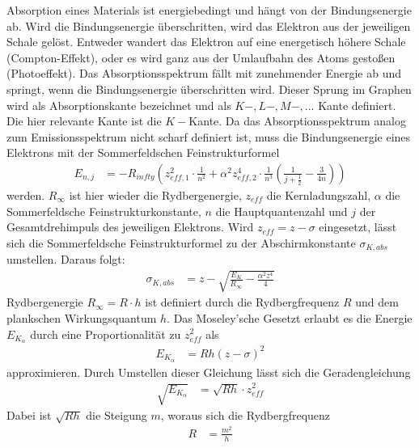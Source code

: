 \justifying Absorption eines Materials ist energiebedingt und hängt von der Bindungsenergie ab. Wird die Bindungsenergie 
überschritten, wird das Elektron aus der jeweiligen Schale gelöst. Entweder wandert das Elektron auf eine energetisch höhere Schale (Compton-Effekt),
oder es wird ganz aus der Umlaufbahn des Atoms gestoßen (Photoeffekt). Das Absorptionsspektrum fällt mit zunehmender Energie ab und springt, wenn
die Bindungsenergie überschritten wird. Dieser Sprung im Graphen wird als Absorptionskante bezeichnet und als $K-, L-, M-,...$ Kante definiert. 
Die hier relevante Kante ist die $K-$Kante. Da das Absorptionsspektrum analog zum Emissionsspektrum nicht scharf definiert ist, muss die Bindungsenergie
eines Elektrons mit der Sommerfeldschen Feinstrukturformel \cite{V602} 
\begin{align}
    E_{n,j} &= -R_{infty} \left( z_{eff,1}^2 \cdot \frac{1}{n^2} + \alpha^2 z_{eff,2}^4 \cdot \frac{1}{n^3} \left( \frac{1}{j+\frac{1}{2}} - \frac{3}{4n} \right) \right) \label{eq:3}
\end{align}
\justifying werden. $R_{\infty}$ ist hier wieder die Rydbergenergie, $z_{eff}$ die Kernladungszahl, $\alpha$ die 
Sommerfeldsche Feinstrukturkonstante, $n$ die Hauptquantenzahl und $j$ der Gesamtdrehimpuls des jeweiligen Elektrons. Wird $z_{eff}=z-\sigma$
eingesetzt, lässt sich die Sommerfeldsche Feinstrukturformel zu der Abschirmkonstante $\sigma_{K,abs}$ umstellen. Daraus folgt: \cite{V602}
\begin{align}
    \sigma_{K,abs} &= z - \sqrt{\frac{E_K}{R_{\infty}} - \frac{\alpha^2 z^4}{4}} \label{eq:4}
\end{align}
\justifying Rydbergenergie $R_{\infty}= R\cdot h$ ist definiert durch die Rydbergfrequenz $R$ und dem plankschen Wirkungsquantum $h$.
Das Moseley'sche Gesetzt erlaubt es die Energie $E_{K_{\alpha}}$ durch eine Proportionalität zu $z_{eff}^2$ als 
\begin{align}
    E_{K_{\alpha}} &= Rh \left( z-\sigma \right)^2 \label{eq:Mosel}
\end{align}
\justifying approximieren. Durch Umstellen dieser Gleichung lässt sich die Geradengleichung
\begin{align}
    \sqrt{E_{K_{\alpha}}} &= \sqrt{Rh}\cdot z_{eff}^2 \label{eq:RyGl}
\end{align}
\justifying Dabei ist $\sqrt{Rh}$ die Steigung $m$, woraus sich die Rydbergfrequenz
\begin{align}
 R &= \frac{m^2}{h} \label{eq:Ryf}
 \end{align}
